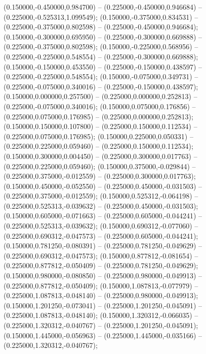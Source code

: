  (0.150000,-0.450000,0.984700) -- (0.225000,-0.450000,0.946684) -- (0.225000,-0.525313,1.099549);
 (0.150000,-0.375000,0.834531) -- (0.225000,-0.375000,0.802598) -- (0.225000,-0.450000,0.946684);
 (0.150000,-0.300000,0.695950) -- (0.225000,-0.300000,0.669888) -- (0.225000,-0.375000,0.802598);
 (0.150000,-0.225000,0.568956) -- (0.225000,-0.225000,0.548554) -- (0.225000,-0.300000,0.669888);
 (0.150000,-0.150000,0.453550) -- (0.225000,-0.150000,0.438597) -- (0.225000,-0.225000,0.548554);
 (0.150000,-0.075000,0.349731) -- (0.225000,-0.075000,0.340016) -- (0.225000,-0.150000,0.438597);
 (0.150000,0.000000,0.257500) -- (0.225000,0.000000,0.252813) -- (0.225000,-0.075000,0.340016);
 (0.150000,0.075000,0.176856) -- (0.225000,0.075000,0.176985) -- (0.225000,0.000000,0.252813);
 (0.150000,0.150000,0.107800) -- (0.225000,0.150000,0.112534) -- (0.225000,0.075000,0.176985);
 (0.150000,0.225000,0.050331) -- (0.225000,0.225000,0.059460) -- (0.225000,0.150000,0.112534);
 (0.150000,0.300000,0.004450) -- (0.225000,0.300000,0.017763) -- (0.225000,0.225000,0.059460);
 (0.150000,0.375000,-0.029844) -- (0.225000,0.375000,-0.012559) -- (0.225000,0.300000,0.017763);
 (0.150000,0.450000,-0.052550) -- (0.225000,0.450000,-0.031503) -- (0.225000,0.375000,-0.012559);
 (0.150000,0.525312,-0.064198) -- (0.225000,0.525313,-0.039632) -- (0.225000,0.450000,-0.031503);
 (0.150000,0.605000,-0.071663) -- (0.225000,0.605000,-0.044241) -- (0.225000,0.525313,-0.039632);
 (0.150000,0.690312,-0.077060) -- (0.225000,0.690312,-0.047573) -- (0.225000,0.605000,-0.044241);
 (0.150000,0.781250,-0.080391) -- (0.225000,0.781250,-0.049629) -- (0.225000,0.690312,-0.047573);
 (0.150000,0.877812,-0.081654) -- (0.225000,0.877812,-0.050409) -- (0.225000,0.781250,-0.049629);
 (0.150000,0.980000,-0.080850) -- (0.225000,0.980000,-0.049913) -- (0.225000,0.877812,-0.050409);
 (0.150000,1.087813,-0.077979) -- (0.225000,1.087813,-0.048140) -- (0.225000,0.980000,-0.049913);
 (0.150000,1.201250,-0.073041) -- (0.225000,1.201250,-0.045091) -- (0.225000,1.087813,-0.048140);
 (0.150000,1.320312,-0.066035) -- (0.225000,1.320312,-0.040767) -- (0.225000,1.201250,-0.045091);
 (0.150000,1.445000,-0.056963) -- (0.225000,1.445000,-0.035166) -- (0.225000,1.320312,-0.040767);
